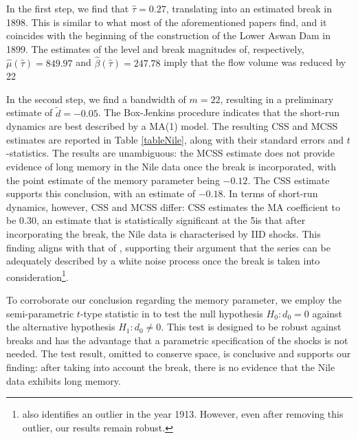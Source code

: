 {{In the first step, we find that $\hat \tau = 0.27 $, translating into an estimated break in 1898. This is similar to what most of the aforementioned papers find, and it coincides with the beginning of the
construction of the Lower Aswan Dam in 1899. The estimates of the level and break magnitudes of, respectively, $\hat \mu (\hat \tau) = 849.97$ and $\hat \beta (\hat \tau) = 247.78$ imply that the flow volume was reduced by
22\

In the second step, we find a bandwidth of $m = 22$, resulting in a preliminary estimate of $\tilde{d} = -0.05$. The Box-Jenkins procedure indicates that the short-run dynamics are best described by a MA(1) model. The resulting
CSS and MCSS estimates are reported in Table \ref{tableNile}, along with their standard errors and $t$-statistics. The results are unambiguous: the MCSS estimate does not provide evidence of long memory in the Nile data once the
break is incorporated, with the point estimate of the memory parameter being $-0.12$.  The CSS estimate supports this conclusion, with an estimate of $-0.18$. In terms of short-run dynamics, however, CSS and MCSS differ: CSS
estimates the MA coefficient to be $0.30$, an estimate that is statistically significant at the 5\conclusion is that after incorporating the break, the Nile data is characterised by IID shocks. This finding aligns with that of \textcite{atkinson1997detecting}, supporting their argument that the series can be adequately described
by a white noise process once the break is taken into consideration\footnote{ \textcite{atkinson1997detecting} also identifies an outlier in the year 1913. However, even after removing this outlier, our results remain robust.}.

To corroborate our conclusion regarding the memory parameter, we employ the semi-parametric $t$-type statistic in \textcite{iacone2022semiparametric} to test the null hypothesis $H_0 \colon d_0 = 0$ against the alternative hypothesis
$H_1 \colon d_0 \neq 0$. This test is designed to be robust against breaks and has the advantage that a parametric specification of the shocks is not needed. The test result, omitted to conserve space, is conclusive and supports our
finding: after taking into account the break, there is no evidence that the Nile data exhibits long memory.


}}
